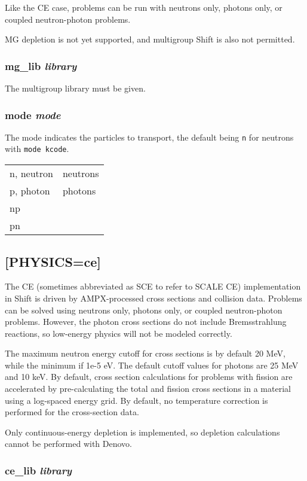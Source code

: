 \documentclass[10pt]{article}
\begin{document}
Like the CE case, problems can be run with neutrons only, photons only, or coupled neutron-photon problems.

MG depletion is not yet supported, and multigroup Shift is also not permitted. 

\subsubsection{mg\_lib \textit{library}}
The multigroup library must be given. 

\subsubsection{mode \textit{mode}}
The mode indicates the particles to transport, the default being \texttt{n} for neutrons with \texttt{mode kcode}.

\begin{tabular}{l l}
n, neutron & neutrons\\
p, photon & photons\\
np & \\
pn & \\
\end{tabular}

\subsection{[PHYSICS=ce]}
The CE (sometimes abbreviated as SCE to refer to SCALE CE) implementation in Shift is driven by AMPX-processed cross sections and collision data. Problems can be solved using neutrons only, photons only, or coupled neutron-photon problems. However, the photon cross sections do not include Bremsstrahlung reactions, so low-energy physics will not be modeled correctly.

The maximum neutron energy cutoff for cross sections is by default 20 MeV, while the minimum if 1e-5 eV. The default cutoff values for photons are 25 MeV and 10 keV. By default, cross section calculations for problems with fission are accelerated by pre-calculating the total and fission cross sections  in a material using a log-spaced energy grid. By default, no temperature correction is performed for the cross-section data. 

Only continuous-energy depletion is implemented, so depletion calculations cannot be performed with Denovo.

\subsubsection{ce\_lib \textit{library}}
\end{document}
